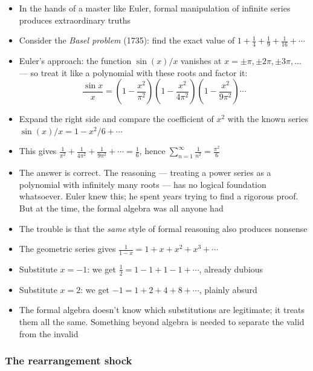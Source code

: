\documentclass[
  10pt,
  letterpaper,
]{scrbook}
\providecommand{\tightlist}{%
  \setlength{\itemsep}{0pt}\setlength{\parskip}{0pt}}
\begin{document}
\begin{itemize}
\tightlist
\item
  In the hands of a master like Euler, formal manipulation of infinite
  series produces extraordinary truths
\item
  Consider the \emph{Basel problem} (1735): find the exact value of
  \(1 + \frac{1}{4} + \frac{1}{9} + \frac{1}{16} + \cdots\)
\item
  Euler's approach: the function \(\sin(x)/x\) vanishes at
  \(x = \pm\pi, \pm 2\pi, \pm 3\pi, \ldots\) --- so treat it like a
  polynomial with these roots and factor it:
  \[\frac{\sin x}{x} = \left(1 - \frac{x^2}{\pi^2}\right)\left(1 - \frac{x^2}{4\pi^2}\right)\left(1 - \frac{x^2}{9\pi^2}\right)\cdots\]
\item
  Expand the right side and compare the coefficient of \(x^2\) with the
  known series \(\sin(x)/x = 1 - x^2/6 + \cdots\)
\item
  This gives
  \(\frac{1}{\pi^2} + \frac{1}{4\pi^2} + \frac{1}{9\pi^2} + \cdots = \frac{1}{6}\),
  hence \(\sum_{n=1}^{\infty} \frac{1}{n^2} = \frac{\pi^2}{6}\)
\item
  The answer is correct. The reasoning --- treating a power series as a
  polynomial with infinitely many roots --- has no logical foundation
  whatsoever. Euler knew this; he spent years trying to find a rigorous
  proof. But at the time, the formal algebra was all anyone had
\item
  The trouble is that the \emph{same} style of formal reasoning also
  produces nonsense
\item
  The geometric series gives
  \(\frac{1}{1-x} = 1 + x + x^2 + x^3 + \cdots\)
\item
  Substitute \(x = -1\): we get
  \(\frac{1}{2} = 1 - 1 + 1 - 1 + \cdots\), already dubious
\item
  Substitute \(x = 2\): we get \(-1 = 1 + 2 + 4 + 8 + \cdots\), plainly
  absurd
\item
  The formal algebra doesn't know which substitutions are legitimate; it
  treats them all the same. Something beyond algebra is needed to
  separate the valid from the invalid
\end{itemize}

\subsubsection*{The rearrangement shock}\label{the-rearrangement-shock}
\end{document}
